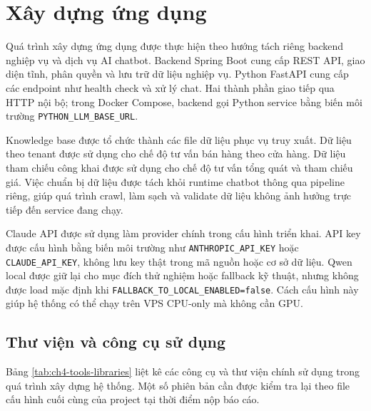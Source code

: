 \documentclass[../DoAn.tex]{subfiles}
\begin{document}
\section{Xây dựng ứng dụng}

Quá trình xây dựng ứng dụng được thực hiện theo hướng tách riêng backend nghiệp vụ và dịch vụ AI chatbot. Backend Spring Boot cung cấp REST API, giao diện tĩnh, phân quyền và lưu trữ dữ liệu nghiệp vụ. Python FastAPI cung cấp các endpoint như health check và xử lý chat. Hai thành phần giao tiếp qua HTTP nội bộ; trong Docker Compose, backend gọi Python service bằng biến môi trường \texttt{PYTHON\_LLM\_BASE\_URL}.

Knowledge base được tổ chức thành các file dữ liệu phục vụ truy xuất. Dữ liệu theo tenant được sử dụng cho chế độ tư vấn bán hàng theo cửa hàng. Dữ liệu tham chiếu công khai được sử dụng cho chế độ tư vấn tổng quát và tham chiếu giá. Việc chuẩn bị dữ liệu được tách khỏi runtime chatbot thông qua pipeline riêng, giúp quá trình crawl, làm sạch và validate dữ liệu không ảnh hưởng trực tiếp đến service đang chạy.

Claude API được sử dụng làm provider chính trong cấu hình triển khai. API key được cấu hình bằng biến môi trường như \texttt{ANTHROPIC\_API\_KEY} hoặc \texttt{CLAUDE\_API\_KEY}, không lưu key thật trong mã nguồn hoặc cơ sở dữ liệu. Qwen local được giữ lại cho mục đích thử nghiệm hoặc fallback kỹ thuật, nhưng không được load mặc định khi \texttt{FALLBACK\_TO\_LOCAL\_ENABLED=false}. Cách cấu hình này giúp hệ thống có thể chạy trên VPS CPU-only mà không cần GPU.

\subsection{Thư viện và công cụ sử dụng}

Bảng \ref{tab:ch4-tools-libraries} liệt kê các công cụ và thư viện chính sử dụng trong quá trình xây dựng hệ thống. Một số phiên bản cần được kiểm tra lại theo file cấu hình cuối cùng của project tại thời điểm nộp báo cáo.
\end{document}
